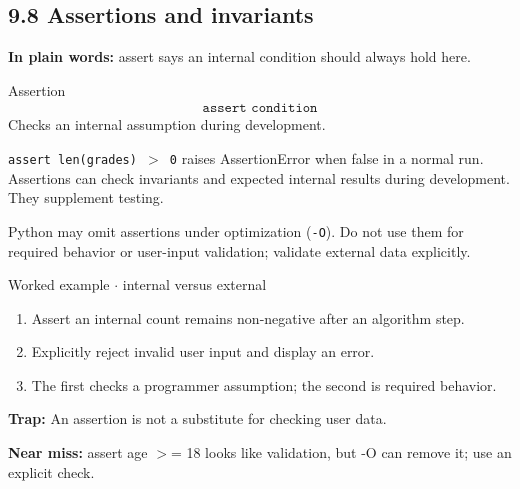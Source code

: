 \documentclass[11pt]{article}
\begin{document}
\begin{keepsection}
\section{9.8 Assertions and invariants}

\begin{plainbox}\textbf{In plain words:} assert says an internal condition should always hold here.\end{plainbox}

\begin{equationcard}{Assertion}
\[ \begin{gathered} \texttt{assert condition} \end{gathered} \]
{\small Checks an internal assumption during development.}
\end{equationcard}

\texttt{assert len(grades) \ensuremath{>} 0} raises AssertionError when false in a normal run. Assertions can check invariants and expected internal results during development. They supplement testing.

Python may omit assertions under optimization (\texttt{-O}). Do not use them for required behavior or user-input validation; validate external data explicitly.

\begin{workedbox}{Worked example \ensuremath{\cdot} internal versus external}
\begin{enumerate}
\item Assert an internal count remains non-negative after an algorithm step.
\item Explicitly reject invalid user input and display an error.
\item The first checks a programmer assumption; the second is required behavior.
\end{enumerate}
\end{workedbox}

\begin{notebox}\textbf{Trap:} An assertion is not a substitute for checking user data.\end{notebox}

\begin{notebox}\textbf{Near miss:} assert age \ensuremath{>}= 18 looks like validation, but -O can remove it; use an explicit check.\end{notebox}


\end{keepsection}
\end{document}
